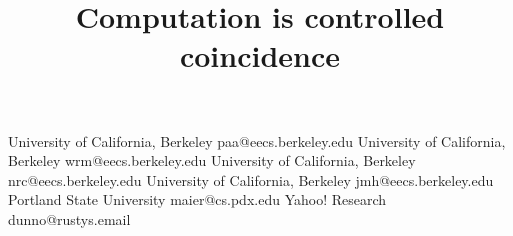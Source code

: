 \documentclass{sigplanconf}
\begin{document}
\copyrightdata{[to be supplied]}

\title{Computation is controlled coincidence} 
%


           {University of California, Berkeley}
           {paa@eecs.berkeley.edu}
           {University of California, Berkeley}
           {wrm@eecs.berkeley.edu}
           {University of California, Berkeley}
           {nrc@eecs.berkeley.edu}
           {University of California, Berkeley}
           {jmh@eecs.berkeley.edu}
           {Portland State University}
           {maier@cs.pdx.edu}
           {Yahoo! Research}
           {dunno@rustys.email}



\maketitle
\end{document}
